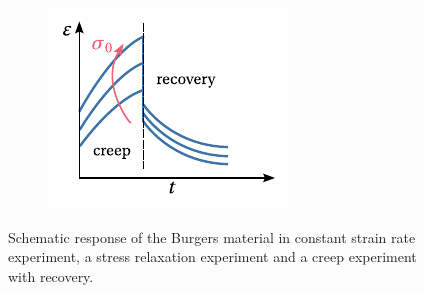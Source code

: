 \begin{figure}
\begin{subfigure}[b]{0.30\textwidth}
            \caption{}
            \label{subfig:burgers_stress_relax}
    \end{subfigure}
    \hfill
    \begin{subfigure}[b]{0.30\textwidth}
      \centering
      \includegraphics[width=\textwidth]{figures/burgers_creep_plus_recov}
      \caption{}
      \label{subfig:burgers_creep_plus_recov}
    \end{subfigure}
  \caption{Schematic response of the Burgers material in  constant strain rate experiment,  a stress relaxation experiment and a  creep experiment with recovery.}
\label{fig:burgers_mat_res}
\end{figure}


